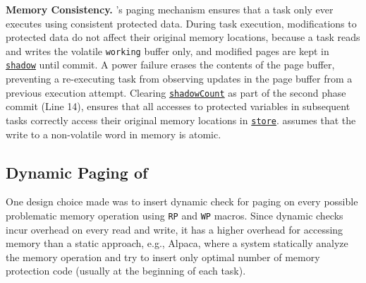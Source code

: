 

\textbf{Memory Consistency.} \sys's paging mechanism ensures that a task only ever executes using consistent protected data. During task execution, modifications to protected data do not affect their original memory locations, because a task reads and writes the volatile \texttt{working} buffer only, and modified pages are kept in \texttt{\underline{shadow}} until commit.
A power failure erases the contents of the page buffer, preventing a re-executing task from observing updates in the page buffer from a previous execution attempt.
Clearing \texttt{\underline{shadowCount}} as part of the second phase commit (Line 14), ensures that all accesses to protected variables in subsequent tasks correctly access their original memory locations in \texttt{\underline{store}}.
\sys assumes that the write to a non-volatile word in memory is atomic.
%
\subsection{Dynamic Paging of \sys}

One design choice \sys made was to insert dynamic check for paging on every
possible problematic memory operation using {\tt RP} and {\tt WP} macros.
Since dynamic checks incur overhead on every read and write, it has a higher
overhead for accessing memory than a static approach,
e.g., Alpaca, where a system statically analyze the memory operation and try to insert only optimal
number of memory protection code (usually at the beginning of each task). 

